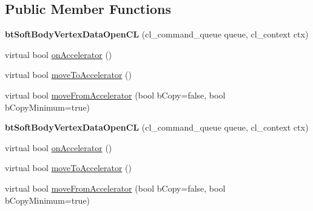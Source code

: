 \subsection*{Public Member Functions}
\begin{DoxyCompactItemize}
\item 
\mbox{\label{classbtSoftBodyVertexDataOpenCL_aa52e7345d905a5bf0b3dd6798c894db1}} 
{\bfseries bt\+Soft\+Body\+Vertex\+Data\+Open\+CL} (cl\+\_\+command\+\_\+queue queue, cl\+\_\+context ctx)
\item 
virtual bool \hyperlink{classbtSoftBodyVertexDataOpenCL_a0277617dbd360ea14ec7848f85b69f4c}{on\+Accelerator} ()
\item 
virtual bool \hyperlink{classbtSoftBodyVertexDataOpenCL_abd4012054faecf26669f00a04bfd6170}{move\+To\+Accelerator} ()
\item 
virtual bool \hyperlink{classbtSoftBodyVertexDataOpenCL_a0ea115bf64323883e19e7bde57a998f1}{move\+From\+Accelerator} (bool b\+Copy=false, bool b\+Copy\+Minimum=true)
\item 
\mbox{\label{classbtSoftBodyVertexDataOpenCL_aa52e7345d905a5bf0b3dd6798c894db1}} 
{\bfseries bt\+Soft\+Body\+Vertex\+Data\+Open\+CL} (cl\+\_\+command\+\_\+queue queue, cl\+\_\+context ctx)
\item 
virtual bool \hyperlink{classbtSoftBodyVertexDataOpenCL_addc1f56a6841561023f4bd48ab2f6dd9}{on\+Accelerator} ()
\item 
virtual bool \hyperlink{classbtSoftBodyVertexDataOpenCL_ad30e5afe5e81dbf16af8b10cdcd54044}{move\+To\+Accelerator} ()
\item 
virtual bool \hyperlink{classbtSoftBodyVertexDataOpenCL_a89dc6f649bbf848d0af34697fbf1d67b}{move\+From\+Accelerator} (bool b\+Copy=false, bool b\+Copy\+Minimum=true)
\end{DoxyCompactItemize}
